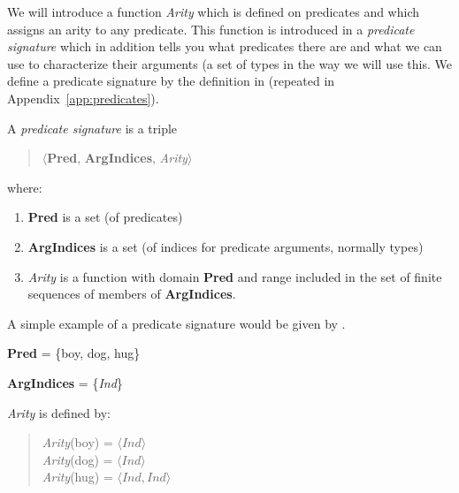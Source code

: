 We will introduce a function \textit{Arity} which is
defined on predicates and which assigns an arity to any predicate.
This function is introduced in a \textit{predicate signature} which in
addition tells you what predicates there are and what we can use to
characterize their arguments (a set of types in the way we will use
this. We define a predicate signature by the definition in \nexteg{}
(repeated in Appendix~\ref{app:predicates}).
\begin{ex} 
A \textit{predicate signature} 
is a triple
\begin{quote}
$\langle$\textbf{Pred}, \textbf{ArgIndices}, \textit{Arity}$\rangle$
\end{quote}
where:
\begin{enumerate} 
 
\item \textbf{Pred} is a set (of predicates)

\item \textbf{ArgIndices} is a set (of indices for predicate
  arguments, normally types)
 
\item \textit{Arity} is a function with domain \textbf{Pred} and range
  included in the set of finite sequences of members of \textbf{ArgIndices}. 
 
\end{enumerate}
\label{ex:pred-sig} 
\end{ex}
A simple example of a predicate signature would be given by \nexteg{}.
\begin{ex} 
\begin{subex} 
 
\item \textbf{Pred} = \{boy, dog, hug\} 
 
\item \textbf{ArgIndices} = \{\textit{Ind}\}

\item \textit{Arity} is defined by:
\begin{quote}
\textit{Arity}(boy) = $\langle\textit{Ind}\rangle$\\
\textit{Arity}(dog) = $\langle\textit{Ind}\rangle$\\
\textit{Arity}(hug) = $\langle\textit{Ind}, \textit{Ind}\rangle$
\end{quote} 
 
\end{subex} 
   
\end{ex} 
   

